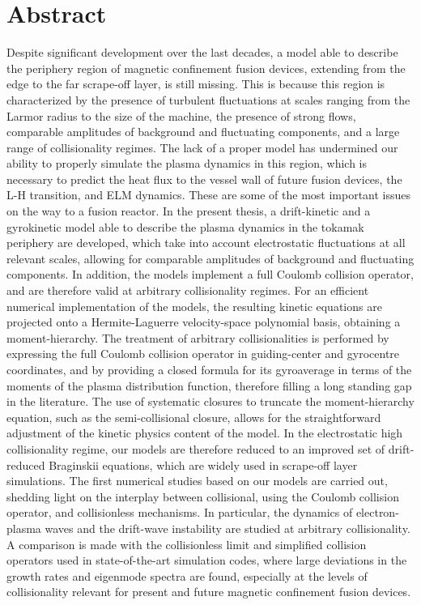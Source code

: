 

\chapter*{Abstract}
\begingroup

Despite significant development over the last decades, a model able to describe the periphery region of magnetic confinement fusion devices, extending from the edge to the far scrape-off layer, is still missing. 
%
This is because this region is characterized by the presence of turbulent fluctuations at scales ranging from the Larmor radius to the size of the machine, the presence of strong flows, comparable amplitudes of background and fluctuating components, and a large range of collisionality regimes.
%
The lack of a proper model has undermined our ability to properly simulate the plasma dynamics in this region, which is necessary to predict the heat flux to the vessel wall of future fusion devices, the L-H transition, and ELM dynamics.
%
These are some of the most important issues on the way to a fusion reactor.
%
In the present thesis, a drift-kinetic and a gyrokinetic model able to describe the plasma dynamics in the tokamak periphery are developed, which take into account electrostatic fluctuations at all relevant scales, allowing for comparable amplitudes of background and fluctuating components.
%
In addition, the models implement a full Coulomb collision operator, and are therefore valid at arbitrary collisionality regimes.
%
For an efficient numerical implementation of the models, the resulting kinetic equations are projected onto a Hermite-Laguerre velocity-space polynomial basis, obtaining a moment-hierarchy.
%
The treatment of arbitrary collisionalities is performed by expressing the full Coulomb collision operator in guiding-center and gyrocentre coordinates, and by providing a closed formula for its gyroaverage in terms of the moments of the plasma distribution function, therefore filling a long standing gap in the literature.
%
The use of systematic closures to truncate the moment-hierarchy equation, such as the semi-collisional closure, allows for the straightforward adjustment of the kinetic physics content of the model.
%
In the electrostatic high collisionality regime, our models are therefore reduced to an improved set of drift-reduced Braginskii equations, which are widely used in scrape-off layer simulations.
%
The first numerical studies based on our models are carried out, shedding light on the interplay between collisional, using the Coulomb collision operator, and collisionless mechanisms.
%
In particular, the dynamics of electron-plasma waves and the drift-wave instability are studied at arbitrary collisionality.
%
A comparison is made with the collisionless limit and simplified collision operators used in state-of-the-art simulation codes, where large deviations in the growth rates and eigenmode spectra are found, especially at the levels of collisionality relevant for present and future magnetic confinement fusion devices. 

